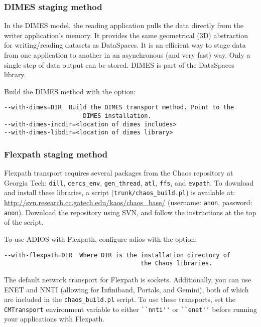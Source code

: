 \subsubsection{DIMES staging method}
In the DIMES model, the reading application pulls the data directly from the writer application's memory. It provides the same geometrical (3D) abstraction for writing/reading datasets as DataSpaces. It is an efficient way to stage data from one application to another in an asynchronous (and very fast) way. Only a single step of data output can be stored. 
DIMES is part of the DataSpaces library. 

\noindent Build the DIMES method with the option:

\begin{lstlisting}
--with-dimes=DIR  Build the DIMES transport method. Point to the
                      DIMES installation.
--with-dimes-incdir=<location of dimes includes>
--with-dimes-libdir=<location of dimes library>
\end{lstlisting}

 
\subsubsection{Flexpath staging method}
 Flexpath transport requires several packages from the Chaos repository at Georgia Tech: \verb+dill+, \verb+cercs_env+, \verb+gen_thread+, \verb+atl+, \verb+ffs+, and \verb+evpath+. 
To download and install these libraries, a script (\verb+trunk/chaos_build.pl+) is available at: \url{http://svn.research.cc.gatech.edu/kaos/chaos_base/} (username: \verb+anon+, password: \verb+anon+). 
Download the repository using SVN, and follow the instructions at the top of the script.

\noindent To use ADIOS with Flexpath, configure adios with the option: 

\begin{lstlisting}
--with-flexpath=DIR  Where DIR is the installation directory of 
                                      the Chaos libraries.
\end{lstlisting}

The default network transport for Flexpath is sockets. Additionally, you can use ENET and NNTI (allowing for Infiniband, Portals, and Gemini), both of which
are included in the \verb+chaos_build.pl+ script. To use these transports, set the \verb+CMTransport+ environment variable to either \verb+``nnti''+ or \verb+``enet''+ before running your applications with Flexpath.

